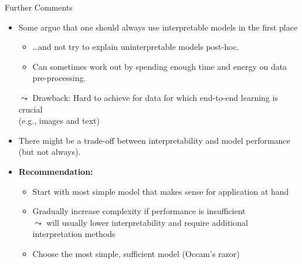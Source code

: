 \documentclass[11pt,compress,t,notes=noshow, aspectratio=169, xcolor=table]{beamer}
\begin{document}
\begin{frame}{Further Comments}

    \begin{itemize}
    \itemsep1em
        \item Some argue that one should always use interpretable models in the first place 
        \begin{itemize}
            \item \ldots and not try to explain uninterpretable models post-hoc.
            \item Can sometimes work out by spending enough time and energy on data pre-processing. %
        \end{itemize}
        \pause
       \item[$\leadsto$] Drawback: Hard to achieve for data for which end-to-end learning is crucial\\ (e.g., images and text)
        \pause
        \item There might be a trade-off between interpretability and model performance (but not always).
        \pause
        \item \textbf{Recommendation:}
        \begin{itemize}
            \item Start with most simple model that makes sense for application at hand
            \item Gradually increase complexity if performance is insufficient\\
            $\leadsto$ will usually lower interpretability and require additional interpretation methods
            \item Choose the most simple, sufficient model (Occam's razor)
        \end{itemize} 
    \end{itemize}

\end{frame}
\end{document}
